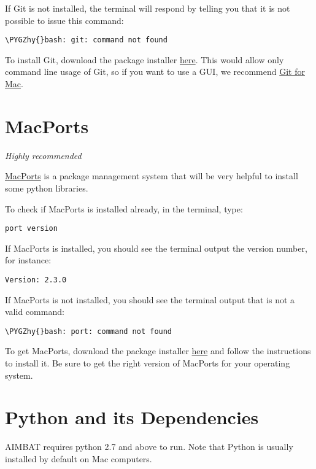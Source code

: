 \documentclass[letterpaper,10pt,english]{sphinxmanual}
\def\PYGZhy{\char`\-}
\begin{document}
If Git is not installed, the terminal will respond by telling you that it is not possible to issue this command:

\begin{Verbatim}[commandchars=\\\{\}]
\PYGZhy{}bash: git: command not found
\end{Verbatim}

To install Git, download the package installer \href{http://git-scm.com/download/mac}{here}. This would allow only command line usage of Git, so if you want to use a GUI, we recommend \href{https://mac.github.com/}{Git for Mac}.


\section{MacPorts}
\label{docfiles/install_dependencies:macports}
\emph{Highly recommended}

\href{http://www.macports.org/}{MacPorts} is a package management system that will be very helpful to install some python libraries.

To check if MacPorts is installed already, in the terminal, type:

\begin{Verbatim}[commandchars=\\\{\}]
port version
\end{Verbatim}

If MacPorts is installed, you should see the terminal output the version number, for instance:

\begin{Verbatim}[commandchars=\\\{\}]
Version: 2.3.0
\end{Verbatim}

If MacPorts is not installed, you should see the terminal output that  is not a valid command:

\begin{Verbatim}[commandchars=\\\{\}]
\PYGZhy{}bash: port: command not found
\end{Verbatim}

To get MacPorts, download the package installer \href{http://www.macports.org/install.php}{here} and follow the instructions to install it. Be sure to get the right version of MacPorts for your operating system.


\section{Python and its Dependencies}
\label{docfiles/install_dependencies:python-and-its-dependencies}
AIMBAT requires python 2.7 and above to run. Note that Python is usually installed by default on Mac computers.
\end{document}
